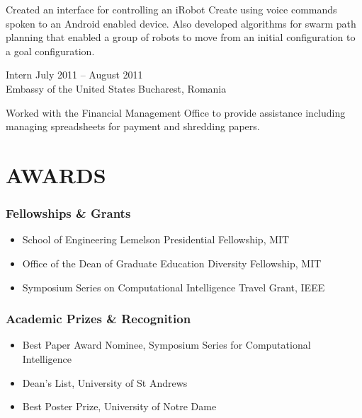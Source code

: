 \documentclass[line,margin]{cv}
\begin{document}
\begin{resume}
\begin{adjustwidth}{2.5em}{2.5em}
    Created an interface for controlling an iRobot Create using voice commands
    spoken to an Android enabled device. Also developed algorithms for swarm
    path planning that enabled a group of robots to move from an initial
    configuration to a goal configuration.

\end{adjustwidth}

Intern
\hfill July 2011 -- August 2011 \\
Embassy of the United States \hfill Bucharest, Romania

\begin{adjustwidth}{2.5em}{2.5em}

    Worked with the Financial Management Office to provide assistance including
    managing spreadsheets for payment and shredding papers.

\end{adjustwidth}

\section{AWARDS}

\subsubsection{Fellowships \& Grants}

\begin{itemize}

    \item School of Engineering Lemelson Presidential Fellowship, MIT
    \item Office of the Dean of Graduate Education Diversity Fellowship, MIT
    \item Symposium Series on Computational Intelligence Travel Grant, IEEE

\end{itemize}

\subsubsection{Academic Prizes \& Recognition}

\begin{itemize}

    \item Best Paper Award Nominee, Symposium Series for Computational
        Intelligence
    \item Dean's List, University of St Andrews
    \item Best Poster Prize, University of Notre Dame


\end{itemize}
\end{resume}
\end{document}
